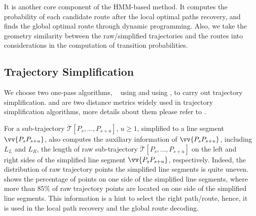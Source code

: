 
It is another core component of the HMM-based method. It computes the probability of each candidate route after the local optimal paths recovery, and finds the global optimal route through dynamic programming.
Also, we take the geometry similarity between the raw/simplified trajectories and the routes into considerations in the computation of transition probabilities.


\subsection{Trajectory Simplification}
\label{sec:simp}



We choose two one-pass algorithms, \ie~\siped \cite{Zhao:Sleeve} using \ped and \cised\cite{Lin:Cised} using \sed, to carry out trajectory
simplification. \ped and \sed are two distance metrics widely used in trajectory simplification algorithms, more details about them please refer to \cite{Lin:Cised, Zhang:Evaluation}.

For a sub-trajectory $\dddot{\mathcal{T}}[P_s, ..., P_{s+u}]$, $u\ge 1$, simplified to a line segment $\vv{P_{s}P_{s+u}}$, \stmm also computes the auxiliary information of $\vv{P_{s}P_{s+u}}$, including $L_L$ and $L_R$, the length of raw sub-trajectory $\dddot{\mathcal{T}}[P_s, ..., P_{s+u}]$ on the left and right sides of the simplified line segment $\vv{P_{s}P_{s+u}}$, respectively. 
%
Indeed, the distribution of raw trajectory points \wrt the simplified line segments is quite uneven.
 shows the percentage of points on one side of the simplified line segments, where more than $85\%$ of raw trajectory points are located on one side of the simplified line segments.
This information is a hint to select the right path/route, hence, it is used in the local path recovery and the global route decoding.

